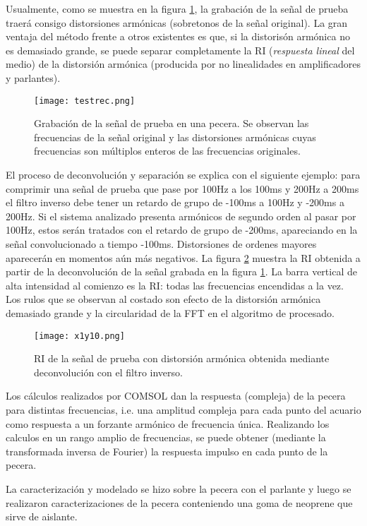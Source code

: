 Usualmente, como se muestra en la figura \ref{fig:testrec}, la grabación de la señal de prueba traerá consigo distorsiones armónicas (sobretonos de la señal original). La gran ventaja del método frente a otros existentes es que, si la distorisón armónica no es demasiado grande, se puede separar completamente la RI (\emph{respuesta lineal} del medio) de la distorsión armónica (producida por no linealidades en amplificadores y parlantes). 

\begin{figure}[H]
	\centering
		\texttt{[image: testrec.png]}
		\caption{Grabación de la señal de prueba en una pecera. Se observan las frecuencias de la señal original y las distorsiones armónicas cuyas frecuencias son múltiplos enteros de las frecuencias originales.}
	\label{fig:testrec}
\end{figure}

El proceso de deconvolución y separación se explica con el siguiente ejemplo: para comprimir una señal de prueba que pase por 100Hz a los 100ms y 200Hz a 200ms el filtro inverso debe tener un retardo de grupo de -100ms a 100Hz y -200ms a 200Hz. Si el sistema analizado presenta armónicos de segundo orden al pasar por 100Hz, estos serán tratados con el retardo de grupo de -200ms, apareciando en la señal convolucionado a tiempo -100ms. Distorsiones de ordenes mayores aparecerán en momentos aún más negativos. La figura \ref{fig:x1y10} muestra la RI obtenida a partir de la deconvolución de la señal grabada en la figura \ref{fig:testrec}. La barra vertical de alta intensidad al comienzo es la RI: todas las frecuencias encendidas a la vez. Los rulos que se observan al costado son efecto de la distorsión armónica demasiado grande y la circularidad de la FFT en el algoritmo de procesado.

\begin{figure}[H]
	\centering
		\texttt{[image: x1y10.png]}
		\caption{RI de la señal de prueba con distorsión armónica obtenida mediante deconvolución con el filtro inverso.}
	\label{fig:x1y10}
\end{figure}

Los cálculos realizados por COMSOL dan la respuesta (compleja) de la pecera para distintas frecuencias, i.e. una amplitud compleja para cada punto del acuario como respuesta a un forzante armónico de frecuencia única. Realizando los calculos en un rango amplio de frecuencias, se puede obtener (mediante la transformada inversa de Fourier) la respuesta impulso en cada punto de la pecera.

La caracterización y modelado se hizo sobre la pecera con el parlante y luego se realizaron caracterizaciones de la pecera conteniendo una goma de neoprene que sirve de aislante.